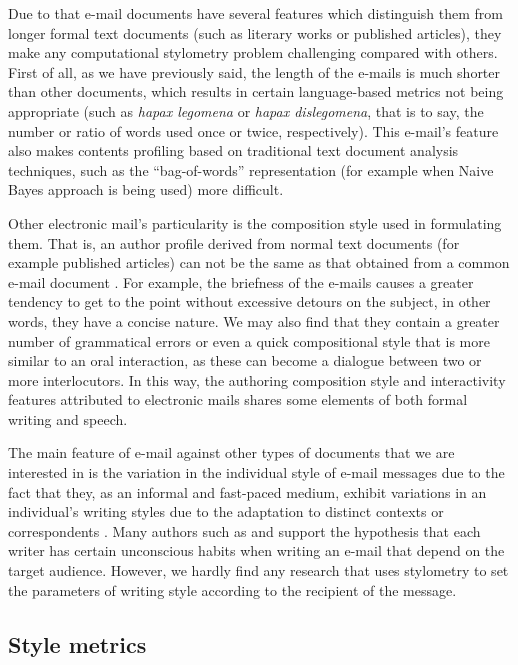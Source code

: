 Due to that e-mail documents have several features which distinguish them from longer formal text documents (such as literary works or published articles), they make any computational stylometry problem challenging compared with others. First of all, as we have previously said, the length of the e-mails is much shorter than other documents, which results in certain language-based metrics not being appropriate (such as \textit{hapax legomena} or \textit{hapax dislegomena}, that is to say, the number or ratio of words used once or twice, respectively). This e-mail's feature also makes contents profiling based on traditional text document analysis techniques, such as the ``bag-of-words'' representation (for example when Naive Bayes approach is being used) more difficult.

Other electronic mail's particularity is the composition style used in formulating them. That is, an author profile derived from normal text documents (for example published articles) can not be the same as that obtained from a common e-mail document \citep{de2001mining}. For example, the briefness of the e-mails causes a greater tendency to get to the point without excessive detours on the subject, in other words, they have a concise nature. We may also find that they contain a greater number of grammatical errors or even a quick compositional style that is more similar to an oral interaction, as these can become a dialogue between two or more interlocutors. In this way, the authoring composition style and interactivity features attributed to electronic mails shares some elements of both formal writing and speech.

The main feature of e-mail against other types of documents that we are interested in is the variation in the individual style of e-mail messages due to the fact that they, as an informal and fast-paced medium, exhibit variations in an individual's writing styles due to the adaptation to distinct contexts or correspondents \citep{argamon2003style}. Many authors such as \cite{allen1974methods} and \cite{de2001mining} support the hypothesis that each writer has certain unconscious habits when writing an e-mail that depend on the target audience. However, we hardly find any research that uses stylometry to set the parameters of writing style according to the recipient of the message.

\subsection{Style metrics}\label{ssect:stymet}

